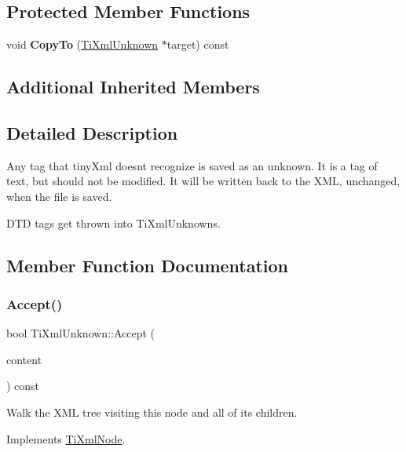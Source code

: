 \subsection*{Protected Member Functions}
\begin{DoxyCompactItemize}
\item 
\mbox{\label{classTiXmlUnknown_afeb334446bcbe13ce15131e1629712be}} 
void {\bfseries Copy\+To} (\hyperlink{classTiXmlUnknown}{Ti\+Xml\+Unknown} $\ast$target) const
\end{DoxyCompactItemize}
\subsection*{Additional Inherited Members}


\subsection{Detailed Description}
Any tag that tiny\+Xml doesn\textquotesingle{}t recognize is saved as an unknown. It is a tag of text, but should not be modified. It will be written back to the X\+ML, unchanged, when the file is saved.

D\+TD tags get thrown into Ti\+Xml\+Unknowns. 

\subsection{Member Function Documentation}
\mbox{\label{classTiXmlUnknown_aafdf1b2d4f561979c7907bad91004999}} 
\subsubsection{\texorpdfstring{Accept()}{Accept()}}
{\footnotesize\ttfamily bool Ti\+Xml\+Unknown\+::\+Accept (\begin{DoxyParamCaption}\item[{\hyperlink{classTiXmlVisitor}{Ti\+Xml\+Visitor} $\ast$}]{content }\end{DoxyParamCaption}) const\hspace{0.3cm}{\ttfamily [virtual]}}

Walk the X\+ML tree visiting this node and all of its children. 

Implements \hyperlink{classTiXmlNode_acc0f88b7462c6cb73809d410a4f5bb86}{Ti\+Xml\+Node}.

